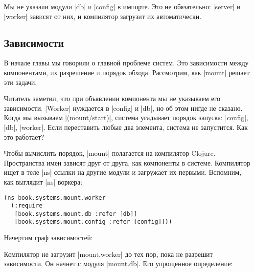 Мы не указали модули \spverb|db| и \spverb|config| в импорте. Это не
обязательно: \spverb|server| и \spverb|worker| зависят от них, и компилятор
загрузит их автоматически.

\subsection{Зависимости}

В начале главы мы говорили о главной проблеме систем. Это зависимости между
компонентами, их разрешение и порядок обхода. Рассмотрим, как \spverb|mount|
решает эти задачи.

Читатель заметил, что при объявлении компонента мы не указываем его
зависимости. \spverb|Worker| нуждается в \spverb|config| и \spverb|db|, но об
этом нигде не сказано. Когда мы вызываем \spverb|(mount/start)|, система
угадывает порядок запуска: \spverb|config|, \spverb|db|, \spverb|worker|. Если
переставить любые два элемента, система не запустится. Как это работает?

Чтобы вычислить порядок, \spverb|mount| полагается на компилятор
Clojure. Пространства имен зависят друг от друга, как компоненты в
системе. Компилятор ищет в теле \spverb|ns| ссылки на другие модули и загружает
их первыми. Вспомним, как выглядит \spverb|ns| воркера:

\begin{verbatim}
(ns book.systems.mount.worker
  (:require
   [book.systems.mount.db :refer [db]]
   [book.systems.mount.config :refer [config]]))
\end{verbatim}

Начертим граф зависимостей:


\vspace{1em}


\vspace{1em}

Компилятор не загрузит \spverb|mount.worker| до тех пор, пока не разрешит
зависимости. Он начнет с модуля \spverb|mount.db|. Его упрощенное определение:

